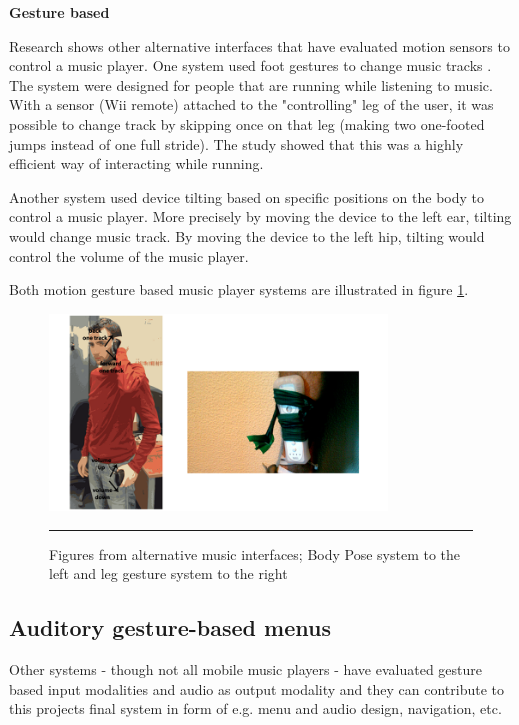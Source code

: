 \textbf{Gesture based}

Research shows other alternative interfaces that have evaluated motion sensors to control a music player. One system used foot gestures to change music tracks \cite{smus_running_2010}. The system were designed for people that are running while listening to music. With a sensor (Wii remote) attached to the "controlling" leg of the user, it was possible to change track by skipping once on that leg (making two one-footed jumps instead of one full stride). The study showed that this was a highly efficient way of interacting while running.

Another system \cite{strachan_bodyspace_2007} used device tilting based on specific positions on the body to control a music player. More precisely by moving the device to the left ear, tilting would change music track. By moving the device to the left hip, tilting would control the volume of the music player.

Both motion gesture based music player systems are illustrated in figure \ref{fig:bodyandleg}.

\begin{figure}[t]
	\centering
		\includegraphics[width=0.8\textwidth,height=\textheight,keepaspectratio]{./Figures/bodyposeandleg.png}
		\rule{35em}{0.5pt}
	\caption[Alternative music players]{Figures from alternative music interfaces; Body Pose system \cite{strachan_bodyspace_2007} to the left and leg gesture system \cite{smus_running_2010} to the right}
	\label{fig:bodyandleg}
\end{figure}


\subsection{Auditory gesture-based menus}
\label{sec:auditorygesturebasedmenus}
Other systems - though not all mobile music players - have evaluated gesture based input modalities and audio as output modality and they can contribute to this projects final system in form of e.g. menu and audio design, navigation, etc.

